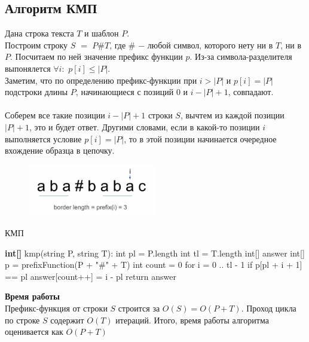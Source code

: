     \subsection{Алгоритм КМП}
        Дана строка текста $T$ и шаблон $P$.\\
        Построим строку $S$ $=$ $P\#T$, где $\#$ $-$ любой символ, которого нету ни в $T$, ни в $P$. Посчитаем по ней значение префикс функции $p$. Из-за символа-разделителя выпонялется $\forall i :$ $p[i] \leq |P|$.\\
        Заметим, что по определению префикс-функции при $i > |P|$ и $p[i] = |P|$ подстроки длины $P$, начинающиеся с позиций $0$ и $i - |P| + 1$, совпадают.\\\\
        Соберем все такие позиции $i - |P| + 1$  строки $S$, вычтем из каждой позиции $|P| + 1$, это и будет ответ. Другими словами, если в какой-то позиции $i$ выполняется условие $p[i] = |P|$, то в этой позиции начинается очередное вхождение образца в цепочку.

        \begin{figure}[H]
                \centering
                \includegraphics[width=0.5\textwidth]{images/chapter6/KMP.png}
                \label{fig:images/chapter6/KMP.png}
        \end{figure}
        
        \begin{algorithm}
        \caption{КМП}
            \begin{algorithmic}
                \STATE \textbf{int[]} kmp(string P, string T):
                \STATE \quad int pl = P.length
                \STATE \quad int tl = T.length
                \STATE \quad int[] answer
                \STATE \quad int[] p = prefixFunction(P + "\#" + T)
                \STATE \quad int count = 0
                \STATE \quad for i = 0 .. tl - 1
                \STATE \quad\quad if p[pl + i + 1] == pl
                \STATE \quad\quad\quad answer[count++] = i - pl
                \STATE \quad return answer
            \end{algorithmic}
        \end{algorithm}

        \textbf{Время работы}\\
        Префикс-функция от строки $S$ строится за $O(S) = O(P+T)$. Проход цикла по строке $S$ содержит $O(T)$ итераций. Итого, время работы алгоритма оценивается как $O(P+T)$
     
